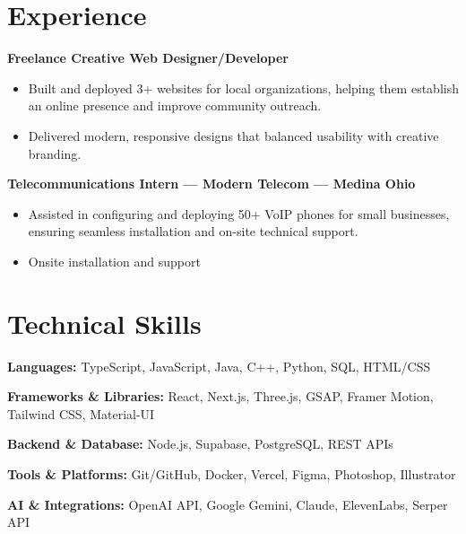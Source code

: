 \documentclass[11pt]{article}
\begin{document}
\section*{Experience}
\textbf{Freelance Creative Web Designer/Developer}
\begin{itemize}
  \item Built and deployed 3+ websites for local organizations, helping them establish an online presence and improve community outreach.
  \item Delivered modern, responsive designs that balanced usability with creative branding.
\end{itemize}

\textbf{Telecommunications Intern — Modern Telecom — Medina Ohio}
\begin{itemize}
  \item Assisted in configuring and deploying 50+ VoIP phones for small businesses, ensuring seamless installation and on-site technical support.
  \item Onsite installation and support
\end{itemize}

\section*{Technical Skills}
\textbf{Languages:} TypeScript, JavaScript, Java, C++, Python, SQL, HTML/CSS

\vspace{2pt}
\textbf{Frameworks \& Libraries:} React, Next.js, Three.js, GSAP, Framer Motion, Tailwind CSS, Material-UI

\vspace{2pt}
\textbf{Backend \& Database:} Node.js, Supabase, PostgreSQL, REST APIs

\vspace{2pt}
\textbf{Tools \& Platforms:} Git/GitHub, Docker, Vercel, Figma, Photoshop, Illustrator

\vspace{2pt}
\textbf{AI \& Integrations:} OpenAI API, Google Gemini, Claude, ElevenLabs, Serper API
\end{document}

